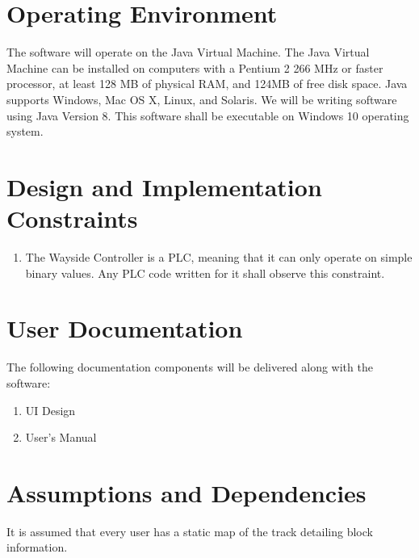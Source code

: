 \documentclass{scrreprt}
\begin{document}
\section{Operating Environment}
The software will operate on the Java Virtual Machine. The Java Virtual Machine
can be installed on computers with a Pentium 2 266 MHz or faster processor, at
least 128 MB of physical RAM, and 124MB of free disk space. Java supports Windows,
Mac OS X, Linux, and Solaris. We will be writing software using Java Version 8.
This software shall be executable on Windows 10 operating system.

\section{Design and Implementation Constraints}
\begin{enumerate}
    \item The Wayside Controller is a PLC, meaning that it can only operate on simple binary values. Any PLC code written for it shall observe this constraint.
\end{enumerate}

\section{User Documentation}

The following documentation components will be delivered along with the software:
\begin{enumerate}
    \item UI Design
    \item User's Manual
\end{enumerate}

\section{Assumptions and Dependencies}
It is assumed that every user has a static map of the track detailing block information.
\end{document}
